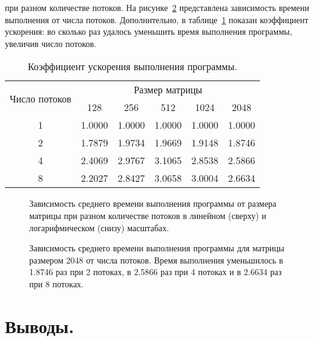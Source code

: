 \documentclass[a4paper,14pt]{extarticle}
\begin{document}
    при разном количестве потоков.
    На рисунке~\ref{fig:res2} представлена зависимость времени выполнения от числа потоков.
    Дополнительно, в таблице~\ref{tab:resm} показан коэффициент ускорения:
    во сколько раз удалось уменьшить время выполнения программы, увеличив число потоков.
    \begin{table}[h!]
        \centering
        \begin{tabular}{cccccc}
            \toprule
            \multirow{2}{*}{Число потоков} & \multicolumn{5}{c}{Размер матрицы} \\
            \cmidrule(l){2-6}
            &  128 & 256 & 512 & 1024 & 2048 \\
            \midrule
            1 & 1.0000 & 1.0000 & 1.0000 & 1.0000 & 1.0000 \\
            2 & 1.7879 & 1.9734 & 1.9669 & 1.9148 & 1.8746 \\
            4 & 2.4069 & 2.9767 & 3.1065 & 2.8538 & 2.5866 \\
            8 & 2.2027 & 2.8427 & 3.0658 & 3.0004 & 2.6634 \\
            \bottomrule
        \end{tabular}
        \caption{Коэффициент ускорения выполнения программы.}
        \label{tab:resm}
    \end{table}

    \begin{figure}[h!]
        \centering
        
        
        \caption{
            Зависимость среднего времени выполнения программы от размера матрицы при разном количестве потоков
            в линейном (сверху) и логарифмическом (снизу) масштабах.
        }
        \label{fig:res}
    \end{figure}

    \begin{figure}[h!]
        
        \caption{
            Зависимость среднего времени выполнения программы для матрицы размером 2048 от числа потоков.
            Время выполнения уменьшилось в  1.8746 раз при 2 потоках,
            в  2.5866 раз при 4 потоках и в 2.6634 раз при 8 потоках.
        }
        \label{fig:res2}
    \end{figure}


    \section{Выводы.}
\end{document}
